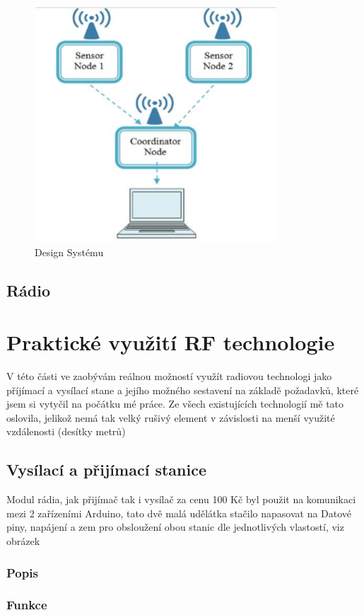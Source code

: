 \documentclass[FM,BP]{tulthesis}
\begin{document}
\begin{figure}
	\begin{center}
		\includegraphics[scale=1.0]{System.png}
		\caption{Design Systému}
		\label{System}
	\end{center}
\end{figure} 
\section {Rádio}
 
\chapter {Praktické využití RF technologie}
V této části ve zaobývám reálnou možností využít radiovou technologi jako příjímací a vysílací stane a jejího možného sestavení na základě požadavků, které jsem si vytyčil na počátku mé práce. Ze všech existujících technologií mě tato oslovila, jelikož nemá tak velký rušivý element v závislosti na menší využité vzdálenosti (desítky metrů)
 \cite{radio}
 \section {Vysílací a přijímací stanice}
  Modul rádia, jak přijímač tak i vysílač za cenu 100 Kč byl použit na komunikaci mezi 2 zařízeními Arduino, tato dvě malá udělátka stačilo napasovat na Datové piny, napájení a zem pro obsloužení obou stanic dle jednotlivých vlastostí, viz obrázek
  \subsection {Popis}
  \subsection {Funkce}
\end{document}
